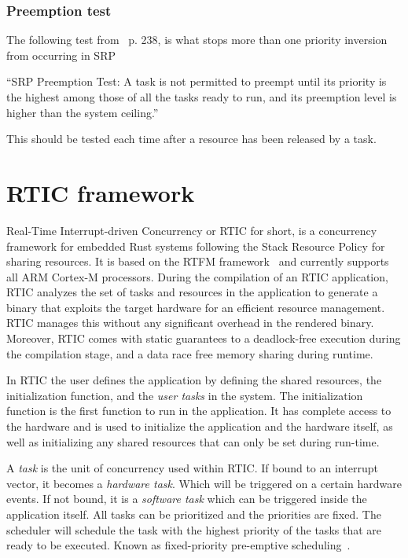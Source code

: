 \subsubsection{Preemption test}
The following test from~\cite{hardrealtimecomputingsystems} p. 238, is what
stops more than one priority inversion from occurring in SRP
\begin{displayquote}
    “SRP Preemption Test: A task is not permitted to preempt until its priority
    is the highest among those of all the tasks ready to run, and its preemption
    level is higher than the system ceiling.”
\end{displayquote}
This should be tested each time after a resource has been released by a task.

\section{RTIC framework}
Real-Time Interrupt-driven Concurrency or RTIC for short, is a concurrency
framework for embedded Rust systems following the Stack Resource Policy for
sharing resources. It is based on the RTFM framework~\cite{rtfm} and currently
supports all ARM Cortex-M processors. During the compilation of an RTIC
application, RTIC analyzes the set of tasks and resources in the application to
generate a binary that exploits the target hardware for an efficient resource
management. RTIC manages this without any significant overhead in the rendered
binary. Moreover, RTIC comes with static guarantees to a deadlock-free
execution during the compilation stage, and a data race free memory sharing
during runtime.

In RTIC the user defines the application by defining the shared resources, the
initialization function, and the \emph{user tasks} in the system. The
initialization function is the first function to run in the application. It has
complete access to the hardware and is used to initialize the application and
the hardware itself, as well as initializing any shared resources that can only
be set during run-time.

A \emph{task} is the unit of concurrency used within RTIC\@. If bound to an
interrupt vector, it becomes a \emph{hardware task}. Which will be
triggered on a certain hardware events. If not bound, it is a \emph{software
task} which can be triggered inside the application itself. All tasks can
be prioritized and the priorities are fixed. The scheduler will schedule the
task with the highest priority of the tasks that are ready to be executed.
Known as fixed-priority pre-emptive scheduling~\cite{fixedpriorityhistory}.

